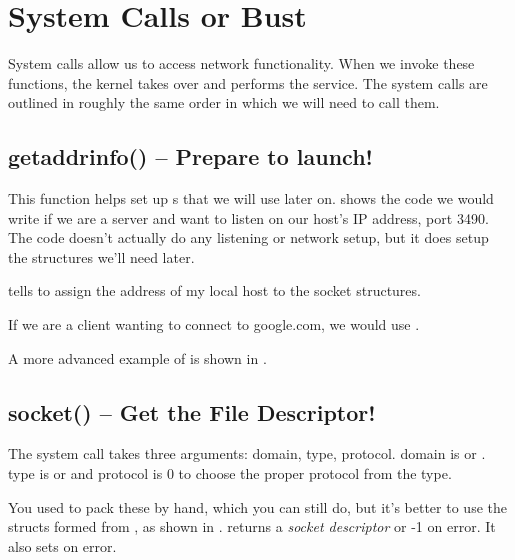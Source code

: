\section{System Calls or Bust}
System calls allow us to access network functionality. When we invoke these functions, the kernel takes over and performs the service. The system calls are outlined in roughly the same order in which we will need to call them.

\subsection{getaddrinfo() -- Prepare to launch!}
This function helps set up s that we will use later on.  shows the code we would write if we are a server and want to listen on our host's IP address, port 3490. The code doesn't actually do any listening or network setup, but it does setup the structures we'll need later. 

 tells  to assign the address of my local host to the socket structures.


If we are a client wanting to connect to google.com, we would use .


A more advanced example of  is shown in .


\subsection{socket() -- Get the File Descriptor!}
The  system call takes three arguments: domain, type, protocol. domain is  or . type is  or  and protocol is 0 to choose the proper protocol from the type. 

You used to pack these by hand, which you can still do, but it's better to use the structs formed from , as shown in .  returns a \emph{socket descriptor} or -1 on error. It also sets  on error. 

